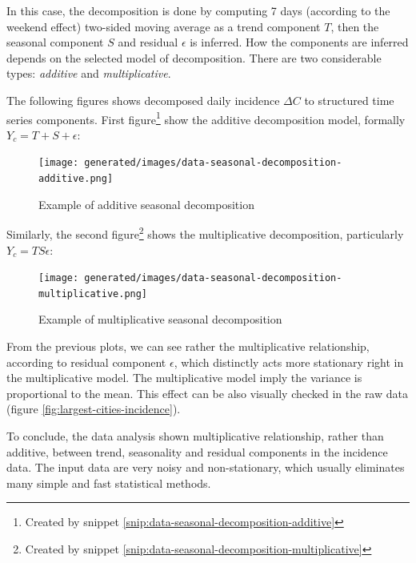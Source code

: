 \documentclass[
  digital, %
  oneside, %
  lof,     %
  lot,     %
]{fithesis4}
\begin{document}
In this case, the decomposition is done by computing 7 days
(according to the weekend effect) 
two-sided moving average as a trend component $T$, then the 
seasonal component $S$ and residual $\epsilon$ is inferred. 
How the components are inferred depends on the selected model 
of decomposition. There are two considerable types: 
\textit{additive} and \textit{multiplicative}.

The following figures shows decomposed daily incidence 
$\Delta C$ to structured time series components. 
First figure\footnote{Created by snippet \ref{snip:data-seasonal-decomposition-additive}} show the additive decomposition model, 
formally $Y_c = T + S + \epsilon$:

\begin{figure}[H]
  \begin{center}
    \texttt{[image: generated/images/data-seasonal-decomposition-additive.png]}
  \end{center}
  \caption{Example of additive seasonal decomposition}
  \label{fig:seasonal-decomposition-additive}
\end{figure}

Similarly, the second figure\footnote{Created by snippet \ref{snip:data-seasonal-decomposition-multiplicative}}
shows the multiplicative decomposition, particularly $Y_c = T S \epsilon$:

\begin{figure}[H]
  \begin{center}
    \texttt{[image: generated/images/data-seasonal-decomposition-multiplicative.png]}
  \end{center}
  \caption{Example of multiplicative seasonal decomposition}
  \label{fig:seasonal-decomposition-multiplicative}
\end{figure}

From the previous plots, we can see rather the multiplicative 
relationship, according to residual component $\epsilon$, 
which distinctly acts more stationary right in the 
multiplicative model. 
The multiplicative model imply the variance is proportional 
to the mean. This effect can be also visually checked  
in the raw data (figure \ref{fig:largest-cities-incidence}).

To conclude, the data analysis shown multiplicative 
relationship, rather than additive, between trend, seasonality and residual 
components in the incidence data. 
The input data are very noisy and non-stationary, which 
usually eliminates many simple and fast statistical methods. 
\end{document}
